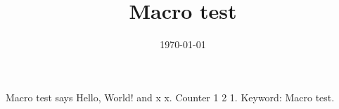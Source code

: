 \documentclass[11pt]{article}
\date{\today}
\title{Macro test}
\begin{document}
\maketitle
\tableofcontents

Macro test says Hello, World! and x x.
Counter 1 2 1.
Keyword: Macro test.
\end{document}
